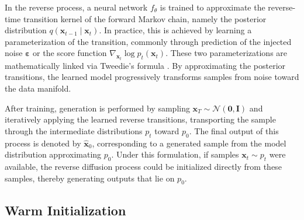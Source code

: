 \documentclass[twoside,a4paper]{article}
\begin{document}
In the reverse process, a neural network $f_\theta$ is trained to approximate the reverse-time transition kernel of the forward Markov chain, namely the posterior distribution $q(\mathbf{x}_{t-1} \mid \mathbf{x}_t)$. In practice, this is achieved by learning a parameterization of the transition, commonly through prediction of the injected noise $\boldsymbol\varepsilon$ or the score function $\nabla_{\mathbf{x}_t} \log p_t(\mathbf{x}_t)$. These two parameterizations are mathematically linked via Tweedie’s formula \cite{efron2011tweedies}. By approximating the posterior transitions, the learned model progressively transforms samples from noise toward the data manifold.

After training, generation is performed by sampling $\mathbf{x}_T \sim \mathcal{N}(\mathbf 0, \mathbf{I})$ and iteratively applying the learned reverse transitions, transporting the sample through the intermediate distributions $p_t$ toward $p_0$. The final output of this process is denoted by $\hat{\mathbf{x}}_0$, corresponding to a generated sample from the model distribution approximating $p_0$. Under this formulation, if samples $\mathbf x_t \sim p_t$ were available, the reverse diffusion process could be initialized directly from these samples, thereby generating outputs that lie on  $p_0$.


\subsection{Warm Initialization}
\end{document}
